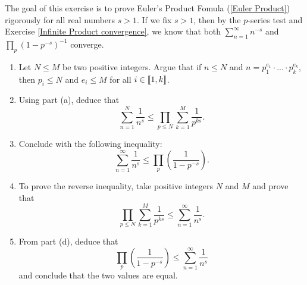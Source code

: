 \begin{exercise} \label{Euler Product Rigorous Proof}
    The goal of this exercise is to prove Euler's Product Fomula (\ref{Euler Product}) rigorously for all real numbers $s > 1$. If we fix $s > 1$, then by the $p$-series test and Exercise \ref{Infinite Product convergence}, we know that both $\sum_{n=1}^{\infty}n^{-s}$ and $\prod_p (1 - p^{-s})^{-1}$ converge. 
    \begin{enumerate}[label=(\alph*)]
        \item Let $N \leq M$ be two positive integers. Argue that if $n \leq N$ and $n = p_1^{e_1} \cdot ... \cdot p_k^{e_k}$, then $p_i \leq N$ and $e_i \leq M$ for all $i \in \llbracket 1 , k \rrbracket$.
        \item Using part (a), deduce that
        $$\sum_{n=1}^{N}\frac{1}{n^s} \leq \prod_{p \leq N} \sum_{k=1}^{M}\frac{1}{p^{ks}}.$$
        \item Conclude with the following inequality:
        $$\sum_{n=1}^{\infty}\frac{1}{n^s} \leq \prod_p \left(\frac{1}{1 - p^{-s}}\right).$$
        \item To prove the reverse inequality, take positive integers $N$ and $M$ and prove that
        $$\prod_{p \leq N} \sum_{k=1}^{M}\frac{1}{p^{ks}} \leq \sum_{n=1}^{\infty}\frac{1}{n^s}.$$
        \item From part (d), deduce that
        $$\prod_p \left(\frac{1}{1 - p^{-s}}\right) \leq \sum_{n=1}^{\infty}\frac{1}{n^s}$$
        and conclude that the two values are equal.
    \end{enumerate}
\end{exercise}